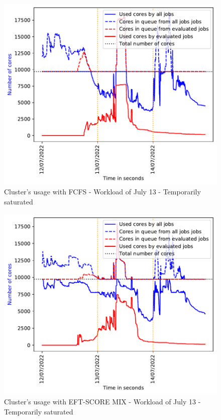 \documentclass[conference,10pt]{IEEEtran}
\begin{document}
\begin{figure}\centering\includegraphics[width=1\linewidth]{../MBSS/plot/2022-07-13->2022-07-13_V10000_Fcfs_Used_nodes_Reduced_450_128_32_256_4_1024.pdf}\caption{Cluster's usage with FCFS - Workload of July 13 - Temporarily saturated}\end{figure}
\begin{figure}\centering\includegraphics[width=1\linewidth]{../MBSS/plot/2022-07-13->2022-07-13_V10000_Fcfs_with_a_score_mixed_strategy_x500_x1_x0_x0_Used_nodes_Reduced_450_128_32_256_4_1024.pdf}\caption{Cluster's usage with EFT-SCORE MIX - Workload of July 13 - Temporarily saturated}\end{figure}
\end{document}
